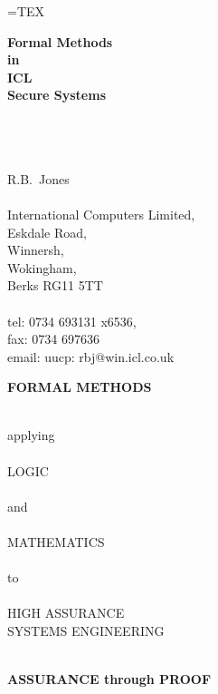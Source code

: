 =TEX
\begin{slide}{}
\begin{center}
{\bf Formal Methods\\
in\\
ICL\\
Secure Systems}

\ \\
\ \\
\ \\

\small{R.B.~Jones \\
\ \\
International Computers Limited,\\
Eskdale Road,\\
Winnersh,\\
Wokingham,\\
Berks RG11 5TT\\
\ \\
tel: 0734 693131 x6536,\\
fax: 0734 697636\\
email: uucp: rbj@win.icl.co.uk}
\end{center}
\end{slide}

\begin{slide}{}

\begin{center}
{\bf FORMAL METHODS}

\ \\

applying\\
\ \\
LOGIC\\
\ \\
and\\
\ \\
MATHEMATICS\\
\ \\
to\\
\ \\
HIGH ASSURANCE\\
SYSTEMS ENGINEERING

\ \\

{\bf ASSURANCE through PROOF}
\end{center}
\end{slide}

